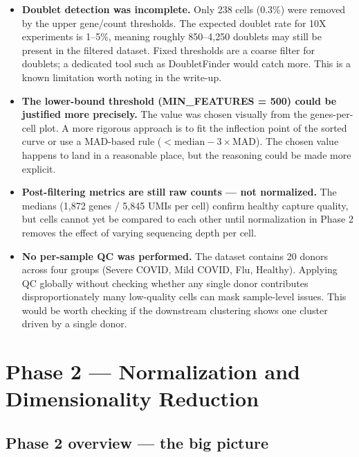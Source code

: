 \documentclass[11pt, a4paper]{article}
\begin{document}
\begin{itemize}[nosep]
  \item \textbf{Doublet detection was incomplete.}
        Only 238 cells (0.3\%) were removed by the upper gene/count thresholds.
        The expected doublet rate for 10X experiments is 1–5\%, meaning roughly
        850–4,250 doublets may still be present in the filtered dataset.
        Fixed thresholds are a coarse filter for doublets; a dedicated tool such as
        DoubletFinder would catch more. This is a known limitation worth noting in the
        write-up.

  \item \textbf{The lower-bound threshold (MIN\_FEATURES = 500) could be justified more precisely.}
        The value was chosen visually from the genes-per-cell plot.
        A more rigorous approach is to fit the inflection point of the sorted curve or
        use a MAD-based rule ($< \text{median} - 3 \times \text{MAD}$).
        The chosen value happens to land in a reasonable place, but the reasoning could
        be made more explicit.

  \item \textbf{Post-filtering metrics are still raw counts — not normalized.}
        The medians (1,872 genes / 5,845 UMIs per cell) confirm healthy capture quality,
        but cells cannot yet be compared to each other until normalization in Phase 2
        removes the effect of varying sequencing depth per cell.

  \item \textbf{No per-sample QC was performed.}
        The dataset contains 20 donors across four groups (Severe COVID, Mild COVID,
        Flu, Healthy). Applying QC globally without checking whether any single donor
        contributes disproportionately many low-quality cells can mask sample-level
        issues. This would be worth checking if the downstream clustering shows
        one cluster driven by a single donor.
\end{itemize}

\section{Phase 2 — Normalization and Dimensionality Reduction}

\subsection{Phase 2 overview — the big picture}
\end{document}

